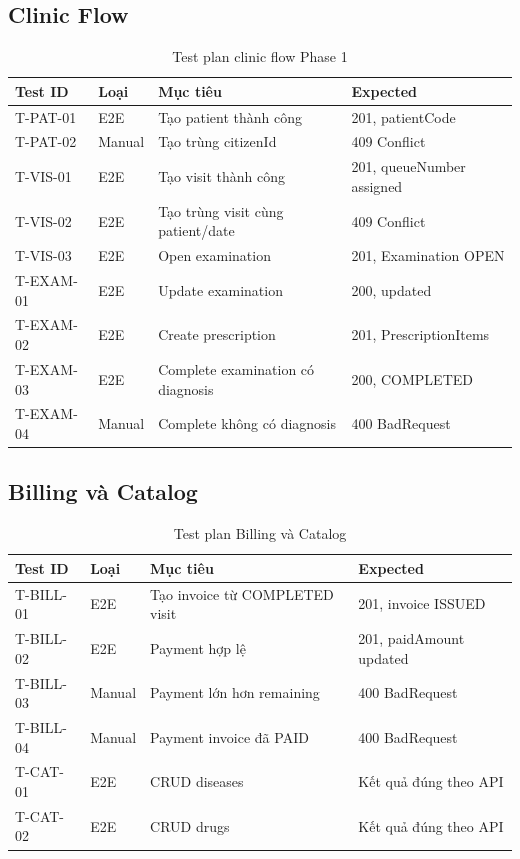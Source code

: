 \subsection{Clinic Flow}

\begin{longtable}{|p{2.5cm}|p{2.2cm}|p{5cm}|p{4.5cm}|}
\caption{Test plan clinic flow Phase 1}\\
\hline
\textbf{Test ID} & \textbf{Loại} & \textbf{Mục tiêu} & \textbf{Expected} \\
\hline
T-PAT-01 & E2E & Tạo patient thành công & 201, patientCode \\
\hline
T-PAT-02 & Manual & Tạo trùng citizenId & 409 Conflict \\
\hline
T-VIS-01 & E2E & Tạo visit thành công & 201, queueNumber assigned \\
\hline
T-VIS-02 & E2E & Tạo trùng visit cùng patient/date & 409 Conflict \\
\hline
T-VIS-03 & E2E & Open examination & 201, Examination OPEN \\
\hline
T-EXAM-01 & E2E & Update examination & 200, updated \\
\hline
T-EXAM-02 & E2E & Create prescription & 201, PrescriptionItems \\
\hline
T-EXAM-03 & E2E & Complete examination có diagnosis & 200, COMPLETED \\
\hline
T-EXAM-04 & Manual & Complete không có diagnosis & 400 BadRequest \\
\hline
\end{longtable}

\subsection{Billing và Catalog}

\begin{table}[H]
\centering
\caption{Test plan Billing và Catalog}
\begin{tabularx}{\textwidth}{|p{2.5cm}|p{2.2cm}|X|p{3.5cm}|}
\hline
\textbf{Test ID} & \textbf{Loại} & \textbf{Mục tiêu} & \textbf{Expected} \\
\hline
T-BILL-01 & E2E & Tạo invoice từ COMPLETED visit & 201, invoice ISSUED \\
\hline
T-BILL-02 & E2E & Payment hợp lệ & 201, paidAmount updated \\
\hline
T-BILL-03 & Manual & Payment lớn hơn remaining & 400 BadRequest \\
\hline
T-BILL-04 & Manual & Payment invoice đã PAID & 400 BadRequest \\
\hline
T-CAT-01 & E2E & CRUD diseases & Kết quả đúng theo API \\
\hline
T-CAT-02 & E2E & CRUD drugs & Kết quả đúng theo API \\
\hline
\end{tabularx}
\end{table}

